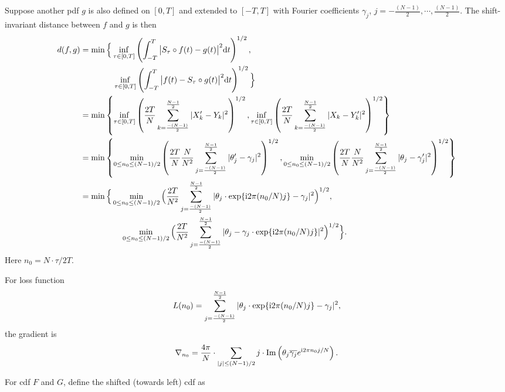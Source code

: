 Suppose another pdf $g$ is also defined on $[0,T]$ and extended to $[-T,T]$ with Fourier coefficients $\gamma_j$, $ j=-\frac{(N-1)}{2}, \cdots, \frac{(N-1)}{2}$. The shift-invariant distance between $f$ and $g$ is then 
\begin{align*}
	 d(f, g) 
	 &= \min\Big\{ \inf_{\tau\in[0,T]} 
	 \left( \int_{-T}^T\big| S_\tau\circ f(t)-g(t) \big|^2 \text{d}t \right)^{1/2}, \\
	 & \qquad \quad \quad \inf_{\tau\in[0,T]}\left( \int_{-T}^T
	 \big| f(t)-S_\tau\circ g(t) \big|^2 \text{d}t \right)^{1/2} \Big\} \\
	 &= \min\left\{ \inf_{\tau\in[0,T]} 
	 \left( 
	 	\frac{2T}{N} \sum_{k=\frac{-(N-1)}{2}}^{\frac{N-1}{2}} |X_k'-Y_k|^2
	 \right)^{1/2}, 
	  \inf_{\tau\in[0,T]}\left( 
	  \frac{2T}{N} \sum_{k=\frac{-(N-1)}{2}}^{\frac{N-1}{2}} |X_k-Y_k'|^2
	 \right)^{1/2} \right\} \\
	 &= \min \left\{ 
	 	\min_{0\leq n_0\leq (N-1)/2} 
	 	\left(\frac{2T}{N}\frac{N}{N^2} 
	 		 	\sum_{j=\frac{-(N-1)}{2}}^{\frac{N-1}{2}}
	 		 	|\theta_j' - \gamma_j|^2 \right)^{1/2} ,
	 	\min_{0\leq n_0\leq (N-1)/2} 
	 	\left(\frac{2T}{N}\frac{N}{N^2} 
	 		 	\sum_{j=\frac{-(N-1)}{2}}^{\frac{N-1}{2}}
	 		 	|\theta_j - \gamma_j'|^2 \right)^{1/2}
	  \right\} \\
	  &= \min \Big\{ 
	 	\min_{0\leq n_0\leq (N-1)/2} 
	 	\Big(\frac{2T}{N^2}\sum_{j=\frac{-(N-1)}{2}}^{\frac{N-1}{2}}
	 		 	|\theta_j \cdot \exp \{ \complexunit{}2\pi (n_0/N)j \} - \gamma_j|^2 \Big)^{1/2}, \\
	 	& \quad \quad \quad \quad \quad 
	 	\min_{0\leq n_0\leq (N-1)/2} 
	 	\Big(\frac{2T}{N^2}\sum_{j=\frac{-(N-1)}{2}}^{\frac{N-1}{2}}
	 	|\theta_j - \gamma_j \cdot \exp \{ \complexunit{}2\pi (n_0/N)j \}|^2 \Big)^{1/2}
	  \Big\}.
\end{align*}
Here $n_0 = N\cdot \tau / 2T$.

For loss function 
\begin{align*}
L(n_0) = \sum_{j=\frac{-(N-1)}{2}}^{\frac{N-1}{2}}
	 		 	|\theta_j \cdot \exp \{ \complexunit{}2\pi (n_0/N)j \} - \gamma_j|^2,
\end{align*}
the gradient is
\begin{align*}
	\nabla_{n_0} = \frac{4\pi}{N}\cdot 
	\sum_{|j|\leq (N-1)/2} j\cdot 
	\text{Im} \left( {\theta_j}\overline{{\gamma_j}}e^{\complexunit2\pi n_0 j/N} \right) 
	.
\end{align*}



For cdf $F$ and $G$, define the shifted (towards left) cdf as


